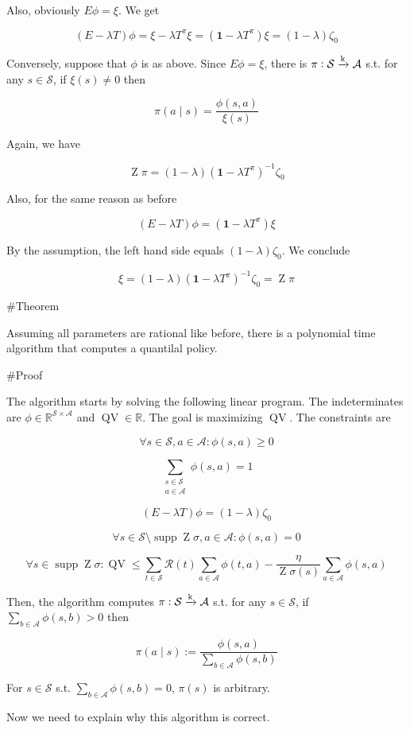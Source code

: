 \documentclass[a4paper]{article}
\DeclareMathOperator{\Supp}{supp}
\newcommand{\AP}[1]{\left(#1\right)}
\newcommand{\Reals}{\mathbb{R}}
\newcommand{\K}{\xrightarrow{\textnormal{k}}}
\newcommand{\A}{\mathcal{A}}
\newcommand{\St}{\mathcal{S}}
\newcommand{\R}{\mathcal{R}}
\newcommand{\QV}{\operatorname{QV}}
\DeclareMathOperator{\Z}{Z}
\begin{document}
Also, obviously $E\phi = \xi$. We get

$$(E-\lambda T)\phi = \xi - \lambda T^\pi\xi = \AP{\boldsymbol{1}-\lambda T^\pi}\xi = (1-\lambda) \zeta_0$$

Conversely, suppose that $\phi$ is as above. Since $E\phi=\xi$, there is $\pi: \St \K \A$ s.t. for any $s\in\St$, if $\xi(s) \ne 0$ then

$$\pi(a \mid s) = \frac{\phi(s,a)}{\xi(s)}$$

Again, we have

$$\Z\pi = (1-\lambda)\AP{\boldsymbol{1} - \lambda T^\pi}^{-1} \zeta_0$$

Also, for the same reason as before

$$(E - \lambda T)\phi = \AP{\boldsymbol{1}-\lambda T^\pi}\xi$$

By the assumption, the left hand side equals $(1-\lambda) \zeta_0$. We conclude

$$\xi = (1-\lambda) \AP{\boldsymbol{1} - \lambda T^\pi}^{-1} \zeta_0 = \Z \pi$$

\#Theorem

Assuming all parameters are rational like before, there is a polynomial time algorithm that computes a quantilal policy.

\#Proof

The algorithm starts by solving the following linear program. The indeterminates are $\phi \in \Reals^{\St\times\A}$ and $\QV\in\Reals$. The goal is maximizing $\QV$. The constraints are

$$\forall s\in\St,a\in\A: \phi(s,a) \geq 0$$

$$\sum_{\substack{s\in\St \\ a\in\A}} \phi(s,a) = 1$$

$$(E - \lambda T) \phi = (1-\lambda) \zeta_0$$

$$\forall s \in \St\setminus\Supp{\Z\sigma},a\in\A: \phi(s,a) = 0$$

$$\forall s \in \Supp{\Z\sigma}: \QV \leq \sum_{t\in\St} \R(t)\sum_{a\in\A}\phi(t,a) - \frac{\eta}{\Z\sigma(s)} \sum_{a\in\A}\phi(s,a)$$

Then, the algorithm computes $\pi: \St \K \A$ s.t. for any $s\in\St$, if $\sum_{b\in\A}\phi(s,b) > 0$ then

$$\pi(a \mid s) := \frac{\phi(s,a)}{\sum_{b\in\A}\phi(s,b)}$$

For $s\in\St$ s.t. $\sum_{b\in\A}\phi(s,b) = 0$, $\pi(s)$ is arbitrary.

Now we need to explain why this algorithm is correct.
\end{document}
